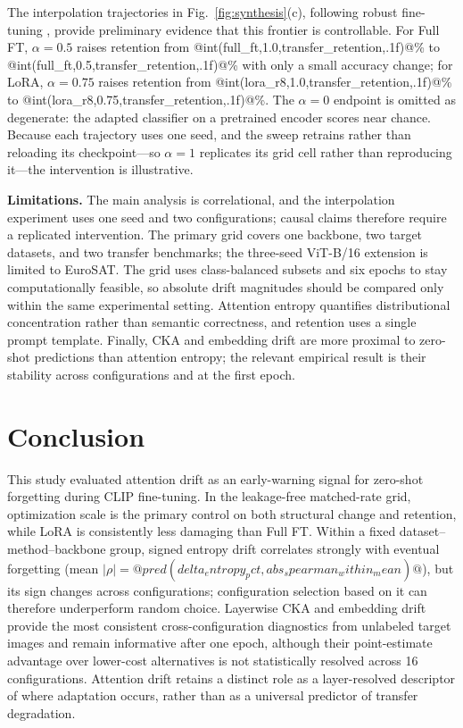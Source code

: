 \documentclass[conference]{IEEEtran}
\begin{document}
The interpolation trajectories in Fig.~\ref{fig:synthesis}(c), following robust fine-tuning \cite{wortsman2022robust}, provide preliminary evidence that this frontier is controllable. For Full FT, $\alpha=0.5$ raises retention from @int(full_ft,1.0,transfer_retention,.1f)@\% to @int(full_ft,0.5,transfer_retention,.1f)@\% with only a small accuracy change; for LoRA, $\alpha=0.75$ raises retention from @int(lora_r8,1.0,transfer_retention,.1f)@\% to @int(lora_r8,0.75,transfer_retention,.1f)@\%. The $\alpha=0$ endpoint is omitted as degenerate: the adapted classifier on a pretrained encoder scores near chance. Because each trajectory uses one seed, and the sweep retrains rather than reloading its checkpoint---so $\alpha=1$ replicates its grid cell rather than reproducing it---the intervention is illustrative.

\textbf{Limitations.} The main analysis is correlational, and the interpolation experiment uses one seed and two configurations; causal claims therefore require a replicated intervention. The primary grid covers one backbone, two target datasets, and two transfer benchmarks; the three-seed ViT-B/16 extension is limited to EuroSAT. The grid uses class-balanced subsets and six epochs to stay computationally feasible, so absolute drift magnitudes should be compared only within the same experimental setting. Attention entropy quantifies distributional concentration rather than semantic correctness, and retention uses a single prompt template. Finally, CKA and embedding drift are more proximal to zero-shot predictions than attention entropy; the relevant empirical result is their stability across configurations and at the first epoch.

\section{Conclusion}
This study evaluated attention drift as an early-warning signal for zero-shot forgetting during CLIP fine-tuning. In the leakage-free matched-rate grid, optimization scale is the primary control on both structural change and retention, while LoRA is consistently less damaging than Full FT. Within a fixed dataset--method--backbone group, signed entropy drift correlates strongly with eventual forgetting (mean $|\rho|=@pred(delta_entropy_pct,abs_spearman_within_mean)@$), but its sign changes across configurations; configuration selection based on it can therefore underperform random choice. Layerwise CKA and embedding drift provide the most consistent cross-configuration diagnostics from unlabeled target images and remain informative after one epoch, although their point-estimate advantage over lower-cost alternatives is not statistically resolved across 16 configurations. Attention drift retains a distinct role as a layer-resolved descriptor of where adaptation occurs, rather than as a universal predictor of transfer degradation.

\FloatBarrier


\end{document}
